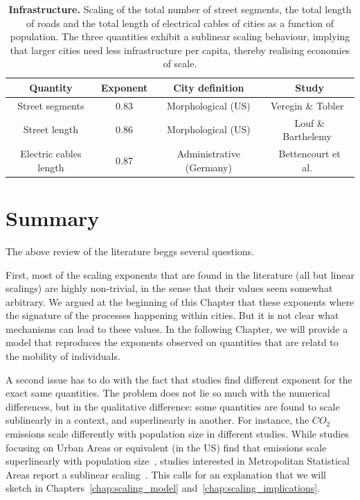 \begin{table}[!h]
    \centering
\begin{tabular}{|cccc|}
\hline
Quantity & Exponent & City definition & Study\\
\hline
Street segments & 0.83 & Morphological (US) & Veregin \& Tobler~\cite{Veregin:1997}\\
Street length & 0.86 & Morphological (US) & Louf \& Barthelemy~\cite{Louf:2014_scaling}\\
Electric cables length & 0.87 & Administrative (Germany) & Bettencourt et al.~\cite{Bettencourt:2007}\\
\hline
\end{tabular}
\caption{{\bf Infrastructure. } Scaling of the total number of street segments,
    the total length of roads and the total length of electrical cables of
    cities as a function of population. The three quantities exhibit a sublinear
    scaling behaviour, implying that larger cities need less infrastructure per
    capita, thereby realising economies of scale.\label{tab:infrastructure}
}
\end{table}

\section{Summary}
\label{sec:summary}


The above review of the literature beggs several questions. 

First, most of the scaling exponents that are found in the literature (all but
linear scalings) are highly non-trivial, in the sense that their values seem 
somewhat arbitrary. We argued at the beginning of this Chapter that these
exponents where the signature of the processes happening within cities. But it
is not clear what mechanisms can lead to these values. In the following Chapter,
we will provide a model that reproduces the exponents observed on quantities
that are relatd to the mobility of individuals.

A second issue has to do with the fact that studies find different exponent for
the exact same quantities. The problem does not lie so much with the numerical
differences, but in the qualitative difference: some quantities are found to
scale sublinearly in a context, and superlinearly in another. For instance, the
$CO_2$ emissions scale differently with population size in different studies.
While studies focusing on Urban Areas or equivalent (in the US) find that
emissions scale superlinearly with population size~\cite{Louf:2014_scaling,
Oliveira:2014}, studies interested in Metropolitan Statistical Areas report a
sublinear scaling~\cite{Fragkias:2013}. This calls for an explanation that we
will sketch in Chapters~\ref{chap:scaling_model}
and~\ref{chap:scaling_implications}.
